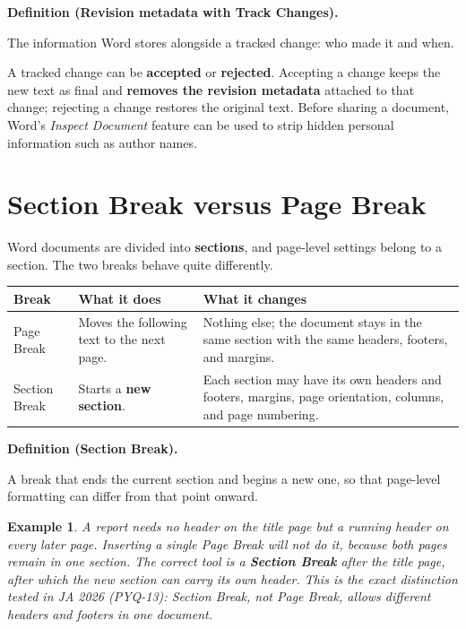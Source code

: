 \documentclass[11pt]{article}
\newtheorem{example}{Example}[section]
\newenvironment{definitionbox}[1]{%
  \par\noindent\textbf{Definition (#1).}\ \itshape
}{\par\vspace{0.3em}}
\begin{document}
\begin{definitionbox}{Revision metadata with Track Changes}
The information Word stores alongside a tracked change: who made it and when.
\end{definitionbox}

A tracked change can be \textbf{accepted} or \textbf{rejected}. Accepting a
change keeps the new text as final and \textbf{removes the revision metadata}
attached to that change; rejecting a change restores the original text. Before
sharing a document, Word's \emph{Inspect Document} feature can be used to
strip hidden personal information such as author names.

\section{Section Break versus Page Break}
Word documents are divided into \textbf{sections}, and page-level settings
belong to a section. The two breaks behave quite differently.

\begin{center}
\begin{tabular}{p{}p{}p{}}
\toprule
\textbf{Break} & \textbf{What it does} & \textbf{What it changes} \\
\midrule
Page Break & Moves the following text to the next page. & Nothing else; the
document stays in the same section with the same headers, footers, and
margins. \\
Section Break & Starts a \textbf{new section}. & Each section may have its own
headers and footers, margins, page orientation, columns, and page numbering. \\
\bottomrule
\end{tabular}
\end{center}

\begin{definitionbox}{Section Break}
A break that ends the current section and begins a new one, so that
page-level formatting can differ from that point onward.
\end{definitionbox}

\begin{example}
A report needs no header on the title page but a running header on every later
page. Inserting a single Page Break will not do it, because both pages remain
in one section. The correct tool is a \textbf{Section Break} after the title
page, after which the new section can carry its own header. This is the exact
distinction tested in JA 2026 (PYQ-13): Section Break, not Page Break, allows
different headers and footers in one document.
\end{example}
\end{document}
